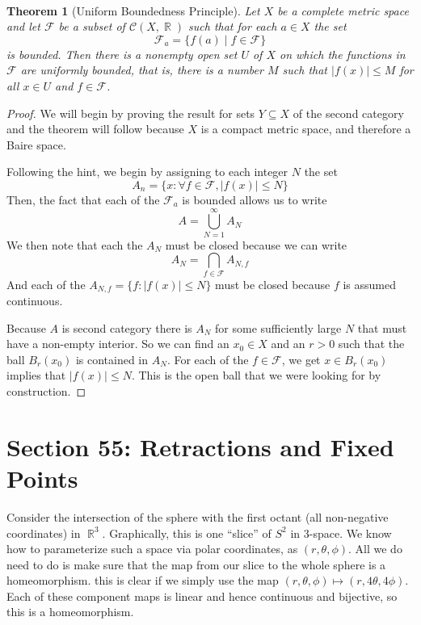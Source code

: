 \documentclass{article}
\DeclareMathOperator{\R}{\mathbb{R}}
\DeclareMathOperator{\suchthat}{\mathrel{:}}
\newcommand{\exercise}[1]{\noindent{\textbf{Exercise #1:}}}
\newtheorem*{thm}{\\ Theorem}
\begin{document}
\exercise{48.8}
\begin{thm}[Uniform Boundedness Principle]
  Let $X$ be a complete metric space and let $\mathcal{F}$ be a subset
  of $\mathcal{C}(X,\R)$ such that for each $a \in X$ the set
  \[
  \mathcal{F}_a = \{f(a) \mathrel{|} f \in \mathcal{F}\}
  \]
  is bounded. Then there is a nonempty open set $U$ of $X$ on which
  the functions in $\mathcal{F}$ are uniformly bounded, that is, there
  is a number $M$ such that $|f(x)| \leq M$ for all $x \in U$ and $f
  \in \mathcal{F}$.
\end{thm}
\begin{proof}
  We will begin by proving the result for sets $Y \subseteq X$ of the
  second category and the theorem will follow because $X$ is a compact
  metric space, and therefore a Baire space.

  Following the hint, we begin by assigning to each integer $N$ the set
  \[
  A_n = \{x\suchthat \forall f \in \mathcal{F}, |f(x)| \leq N\}
  \]
  Then, the fact that each of the $\mathcal{F}_a$ is bounded allows us
  to write
  \[
  A = \bigcup_{N = 1}^\infty A_N
  \]
  We then note that each the $A_N$ must be closed because we can write
  \[
  A_N = \bigcap_{f \in \mathcal{F}} A_{N,f}
  \]
  And each of the $A_{N,f} = \{f\suchthat |f(x)| \leq N\}$ must be
  closed because $f$ is assumed continuous.

  Because $A$ is second category there is $A_N$ for some sufficiently
  large $N$ that must have a non-empty interior. So we can find an
  $x_0 \in X$ and an $r > 0$ such that the ball $B_r(x_0)$ is
  contained in $A_N$. For each of the $f \in \mathcal{F}$, we get $x
  \in B_r(x_0)$ implies that $|f(x)| \leq N$. This is the open ball
  that we were looking for by construction.
\end{proof}

\section{Section 55: Retractions and Fixed Points}

\exercise{55.3}

 Consider the intersection of the sphere with the first
octant (all non-negative coordinates) in $\R^3$. Graphically, this is
one ``slice'' of $S^2$ in 3-space. We know how to parameterize such a
space via polar coordinates, as $(r,\theta, \phi)$. All we do need to
do is make sure that the map from our slice to the whole sphere is a
homeomorphism. this is clear if we simply use the map $(r,\theta,
\phi) \mapsto (r, 4\theta, 4\phi)$. Each of these component maps is
linear and hence continuous and bijective, so this is a homeomorphism. 
\end{document}

